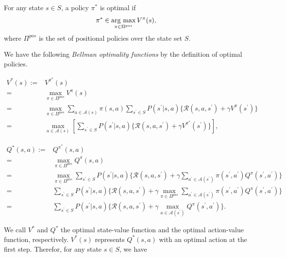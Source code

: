 \begin{definition}
  For any state $s \in S$, a policy $\pi^{\ast}$ is optimal if
  \begin{align*}
    \pi^{\ast} \in \mathop{\rm arg~max}\limits_{\pi \in \Pi^{pos}} V^{\pi}(s),
  \end{align*}
where $\Pi^{pos}$ is the set of positional policies over the state set $S$.

We have the following {\it Bellman optimality functions} by the definition of optimal policies.

\begin{align}
  V^{\ast}(s) := & V^{\pi^{\ast}}(s) \nonumber \\
               = & \max_{\pi \in \Pi^{pos}} V^{\pi}(s) \nonumber \\
                    = & \max_{\pi \in \Pi^{pos}} \sum_{a \in \mathcal{A}(s)} \pi(s,a) \sum_{s^{\prime} \in S} P(s^{\prime}|s,a) \{ \mathcal{R}(s, a, s^{\prime}) + \gamma V^{\pi}(s^{\prime}) \} \nonumber \\
                    = & \max_{a \in \mathcal{A}(s)} [ \sum_{s^{\prime} \in S} P(s^{\prime}|s,a) \{ \mathcal{R}(s, a, s^{\prime}) + \gamma V^{\pi^{\ast}}(s^{\prime}) \} ],
\label{opt_V}
\end{align}

\begin{align}
  Q^{\ast}(s,a) := & Q^{\pi^{\ast}}(s,a) \nonumber \\
                = & \max_{\pi \in \Pi^{pos}} Q^{\pi}(s,a) \nonumber \\
                      = & \max_{\pi \in \Pi^{pos}} \sum_{s^{\prime} \in S} P(s^{\prime}|s,a) \{ \mathcal{R}(s, a, s^{\prime}) + \gamma \sum_{a^{\prime} \in \mathcal{A}(s^{\prime})} \pi(s^{\prime}, a^{\prime}) Q^{\pi}(s^{\prime},a^{\prime}) \} \nonumber \\
                      = & \sum_{s^{\prime} \in S} P(s^{\prime}|s,a) \{ \mathcal{R}(s, a, s^{\prime}) + \gamma \max_{\pi \in \Pi^{pos}} \sum_{a^{\prime} \in \mathcal{A}(s^{\prime})} \pi(s^{\prime}, a^{\prime}) Q^{\pi}(s^{\prime},a^{\prime}) \} \nonumber \\
                      = & \sum_{s^{\prime} \in S} P(s^{\prime}|s,a) \{ \mathcal{R}(s, a, s^{\prime}) + \gamma \max_{a \in \mathcal{A}(s^{\prime})} Q^{\pi}(s^{\prime},a^{\prime}) \}.
\label{opt_Q}
\end{align}
\label{opt_pol}
\end{definition}

We call $V^{\ast}$ and $Q^{\ast}$ the optimal state-value function and the optimal action-value function, respectively. $V^{\ast}(s)$ represents $Q^{\ast}(s,a)$ with an optimal action at the first step. Therefor, for any state $s \in S$, we have

